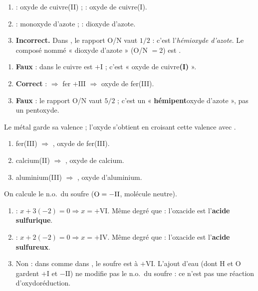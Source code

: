 \documentclass[11pt,a4paper]{article}
\begin{document}
\begin{corrige}
\begin{enumerate}[label=\alph*)]
  \item {} : oxyde de cuivre(II) ;  : oxyde de cuivre(I).
  \item {} : monoxyde d'azote ;  : dioxyde d'azote.
  \item \textbf{Incorrect.} Dans , le rapport O/N vaut $1/2$ : c'est l'\emph{hémioxyde d'azote}.
        Le composé nommé « dioxyde d'azote » (O/N $=2$) est .
\end{enumerate}
\end{corrige}

\begin{corrige}
\begin{enumerate}[label=\alph*)]
  \item \textbf{Faux} : dans  le cuivre est $+\mathrm{I}$ ; c'est « oxyde de cuivre\textbf{(I)} ».
  \item \textbf{Correct} :  $\Rightarrow$ fer $+\mathrm{III}$ $\Rightarrow$ oxyde de fer(III).
  \item \textbf{Faux} : le rapport O/N vaut $5/2$ ; c'est un « \textbf{hémipent}oxyde d'azote », pas un pentoxyde.
\end{enumerate}
\end{corrige}

\begin{corrige}
Le métal garde sa valence ; l'oxyde s'obtient en croisant cette valence avec .
\begin{enumerate}[label=\alph*)]
  \item fer(III) $\Rightarrow$ , oxyde de fer(III).
  \item calcium(II) $\Rightarrow$ , oxyde de calcium.
  \item aluminium(III) $\Rightarrow$ , oxyde d'aluminium.
\end{enumerate}
\end{corrige}

\begin{corrige}
On calcule le n.o.\ du soufre ($\ce{O}=-\mathrm{II}$, molécule neutre).
\begin{enumerate}[label=\alph*)]
  \item {} : $x+3(-2)=0 \Rightarrow x=+\mathrm{VI}$. Même degré que  : l'oxacide est
        l'\textbf{acide sulfurique}.
  \item {} : $x+2(-2)=0 \Rightarrow x=+\mathrm{IV}$. Même degré que  : l'oxacide est
        l'\textbf{acide sulfureux}.
  \item Non : dans  comme dans , le soufre est à $+\mathrm{VI}$. L'ajout d'eau (dont H et
        O gardent $+\mathrm{I}$ et $-\mathrm{II}$) ne modifie pas le n.o.\ du soufre : ce n'est pas une réaction d'oxydoréduction.
\end{enumerate}
\end{corrige}
\end{document}
